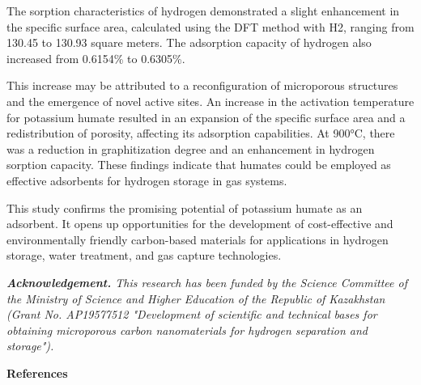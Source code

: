 \begin{multicols}{2}
The sorption characteristics of hydrogen demonstrated a slight
enhancement in the specific surface area, calculated using the DFT
method with H2, ranging from 130.45 to 130.93 square meters. The
adsorption capacity of hydrogen also increased from 0.6154\% to
0.6305\%.

This increase may be attributed to a reconfiguration of microporous
structures and the emergence of novel active sites. An increase in the
activation temperature for potassium humate resulted in an expansion of
the specific surface area and a redistribution of porosity, affecting
its adsorption capabilities. At 900°C, there was a reduction in
graphitization degree and an enhancement in hydrogen sorption capacity.
These findings indicate that humates could be employed as effective
adsorbents for hydrogen storage in gas systems.

This study confirms the promising potential of potassium humate as an
adsorbent. It opens up opportunities for the development of
cost-effective and environmentally friendly carbon-based materials for
applications in hydrogen storage, water treatment, and gas capture
technologies.

\emph{{\bfseries Acknowledgement.} This research has been funded by the
Science Committee of the Ministry of Science and Higher Education of the
Republic of Kazakhstan (Grant No. AP19577512 "Development of scientific
and technical bases for obtaining microporous carbon nanomaterials for
hydrogen separation and storage").}
\end{multicols}

\begin{center}
{\bfseries References}
\end{center}

